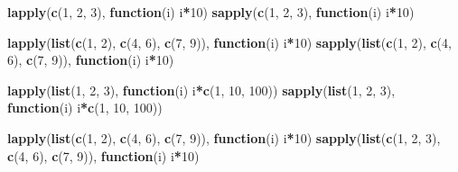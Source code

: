 \documentclass[]{book}
\newenvironment{Shaded}{\begin{snugshade}}{\end{snugshade}}
\newcommand{\ControlFlowTok}[1]{\textcolor[rgb]{0.13,0.29,0.53}{\textbf{#1}}}
\newcommand{\DecValTok}[1]{\textcolor[rgb]{0.00,0.00,0.81}{#1}}
\newcommand{\KeywordTok}[1]{\textcolor[rgb]{0.13,0.29,0.53}{\textbf{#1}}}
\newcommand{\NormalTok}[1]{#1}
\newcommand{\OperatorTok}[1]{\textcolor[rgb]{0.81,0.36,0.00}{\textbf{#1}}}
\begin{document}
\begin{Shaded}
\begin{Highlighting}[]
\KeywordTok{lapply}\NormalTok{(}\KeywordTok{c}\NormalTok{(}\DecValTok{1}\NormalTok{, }\DecValTok{2}\NormalTok{, }\DecValTok{3}\NormalTok{), }\ControlFlowTok{function}\NormalTok{(i) i}\OperatorTok{*}\DecValTok{10}\NormalTok{)}
\KeywordTok{sapply}\NormalTok{(}\KeywordTok{c}\NormalTok{(}\DecValTok{1}\NormalTok{, }\DecValTok{2}\NormalTok{, }\DecValTok{3}\NormalTok{), }\ControlFlowTok{function}\NormalTok{(i) i}\OperatorTok{*}\DecValTok{10}\NormalTok{)}

\KeywordTok{lapply}\NormalTok{(}\KeywordTok{list}\NormalTok{(}\KeywordTok{c}\NormalTok{(}\DecValTok{1}\NormalTok{, }\DecValTok{2}\NormalTok{), }\KeywordTok{c}\NormalTok{(}\DecValTok{4}\NormalTok{, }\DecValTok{6}\NormalTok{), }\KeywordTok{c}\NormalTok{(}\DecValTok{7}\NormalTok{, }\DecValTok{9}\NormalTok{)), }\ControlFlowTok{function}\NormalTok{(i) i}\OperatorTok{*}\DecValTok{10}\NormalTok{)}
\KeywordTok{sapply}\NormalTok{(}\KeywordTok{list}\NormalTok{(}\KeywordTok{c}\NormalTok{(}\DecValTok{1}\NormalTok{, }\DecValTok{2}\NormalTok{), }\KeywordTok{c}\NormalTok{(}\DecValTok{4}\NormalTok{, }\DecValTok{6}\NormalTok{), }\KeywordTok{c}\NormalTok{(}\DecValTok{7}\NormalTok{, }\DecValTok{9}\NormalTok{)), }\ControlFlowTok{function}\NormalTok{(i) i}\OperatorTok{*}\DecValTok{10}\NormalTok{)}

\KeywordTok{lapply}\NormalTok{(}\KeywordTok{list}\NormalTok{(}\DecValTok{1}\NormalTok{, }\DecValTok{2}\NormalTok{, }\DecValTok{3}\NormalTok{), }\ControlFlowTok{function}\NormalTok{(i) i}\OperatorTok{*}\KeywordTok{c}\NormalTok{(}\DecValTok{1}\NormalTok{, }\DecValTok{10}\NormalTok{, }\DecValTok{100}\NormalTok{))}
\KeywordTok{sapply}\NormalTok{(}\KeywordTok{list}\NormalTok{(}\DecValTok{1}\NormalTok{, }\DecValTok{2}\NormalTok{, }\DecValTok{3}\NormalTok{), }\ControlFlowTok{function}\NormalTok{(i) i}\OperatorTok{*}\KeywordTok{c}\NormalTok{(}\DecValTok{1}\NormalTok{, }\DecValTok{10}\NormalTok{, }\DecValTok{100}\NormalTok{))}

\KeywordTok{lapply}\NormalTok{(}\KeywordTok{list}\NormalTok{(}\KeywordTok{c}\NormalTok{(}\DecValTok{1}\NormalTok{, }\DecValTok{2}\NormalTok{), }\KeywordTok{c}\NormalTok{(}\DecValTok{4}\NormalTok{, }\DecValTok{6}\NormalTok{), }\KeywordTok{c}\NormalTok{(}\DecValTok{7}\NormalTok{, }\DecValTok{9}\NormalTok{)), }\ControlFlowTok{function}\NormalTok{(i) i}\OperatorTok{*}\DecValTok{10}\NormalTok{)}
\KeywordTok{sapply}\NormalTok{(}\KeywordTok{list}\NormalTok{(}\KeywordTok{c}\NormalTok{(}\DecValTok{1}\NormalTok{, }\DecValTok{2}\NormalTok{, }\DecValTok{3}\NormalTok{), }\KeywordTok{c}\NormalTok{(}\DecValTok{4}\NormalTok{, }\DecValTok{6}\NormalTok{), }\KeywordTok{c}\NormalTok{(}\DecValTok{7}\NormalTok{, }\DecValTok{9}\NormalTok{)), }\ControlFlowTok{function}\NormalTok{(i) i}\OperatorTok{*}\DecValTok{10}\NormalTok{)}
\end{Highlighting}
\end{Shaded}
\end{document}
